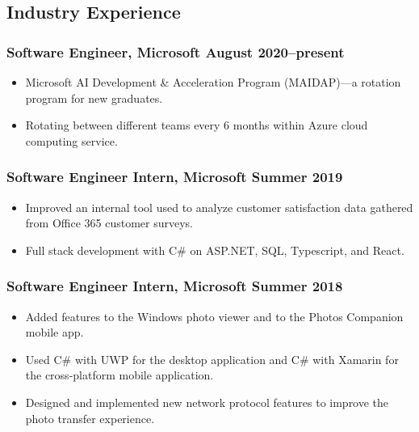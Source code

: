 \documentclass{article}
\begin{document}
	\subsection*{Industry Experience}
		\subsubsection*{Software Engineer, Microsoft \hfill \normalfont \normalsize August 2020--present}
		\begin{itemize}[noitemsep,leftmargin=40pt]
			\item Microsoft AI Development \& Acceleration Program (MAIDAP)---a rotation program for new graduates.
			\item Rotating between different teams every 6 months within Azure cloud computing service.
		\end{itemize}
		\subsubsection*{Software Engineer Intern, Microsoft \hfill \normalfont \normalsize Summer 2019}
		\begin{itemize}[noitemsep,leftmargin=40pt]
			\item Improved an internal tool used to analyze customer satisfaction data gathered from Office 365 customer surveys.
			\item Full stack development with C\# on ASP.NET, SQL, Typescript, and React.
		\end{itemize}
		\subsubsection*{Software Engineer Intern, Microsoft \hfill \normalfont \normalsize Summer 2018}
		\begin{itemize}[noitemsep,leftmargin=40pt]
			\item Added features to the Windows photo viewer and to the Photos Companion mobile app.
			\item Used C\# with UWP for the desktop application and C\# with Xamarin for the cross-platform mobile application.
			\item Designed and implemented new network protocol features to improve the photo transfer experience.
		\end{itemize}

\end{document}
